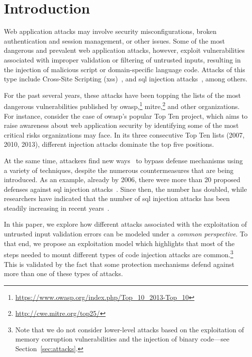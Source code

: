 \documentclass[10pt,journal,compsoc]{IEEEtran}
\begin{document}
\maketitle

\IEEEdisplaynontitleabstractindextext

\IEEEpeerreviewmaketitle

\section{Introduction}

Web application attacks may involve security misconfigurations, broken
authentication and session management, or other issues. Some of the
most dangerous and prevalent web application attacks, however,
exploit vulnerabilities associated with improper validation or filtering
of untrusted inputs, resulting in the injection of malicious
script or domain-specific language code.
Attacks of this type include Cross-Site Scripting ({\sc xss})~\cite{SG07},
and {\sc sql} injection attacks~\cite{RL12b},
among others.

For the past several years,
these attacks have been topping the lists of the most dangerous vulnerabilities
published by
{\sc owasp},\footnote{\scriptsize\url{https://www.owasp.org/index.php/Top_10_2013-Top_10}}
{\sc mitre},\footnote{\scriptsize\url{http://cwe.mitre.org/top25/}}
and other organizations.
For instance, consider the case of {\sc owasp}'s popular Top Ten
project,%
which aims to raise awareness about web application security by
identifying some of the most critical risks organizations may face.
In its three consecutive Top Ten lists (2007, 2010, 2013), different
injection attacks dominate the top five positions.

At the same time, attackers find new ways~\cite{HNSHS12,DKH14}
to bypass defense mechanisms using a variety of techniques,
despite the numerous countermeasures that are being introduced.
As an example, already by 2006,
there were more than 20 proposed defenses
against {\sc sql} injection attacks~\cite{HVO06}.
Since then, the number has doubled, while researchers have indicated that
the number of {\sc sql} injection attacks has been steadily
increasing in recent years~\cite{SSL12}.

In this paper, we explore how different attacks associated with 
the exploitation of untrusted input validation errors can be modeled 
under a {\it common perspective}. To that end, we propose an exploitation
model which highlights that most of the steps needed to mount
different types of code injection attacks are
common.\footnote{\scriptsize Note that we do not consider lower-level attacks based on
the exploitation of memory corruption vulnerabilities and the injection
of binary code---see Section~\ref{sec:attacks}.} This is validated by the fact that
some protection mechanisms defend against more than one of these
types of attacks.
\end{document}
